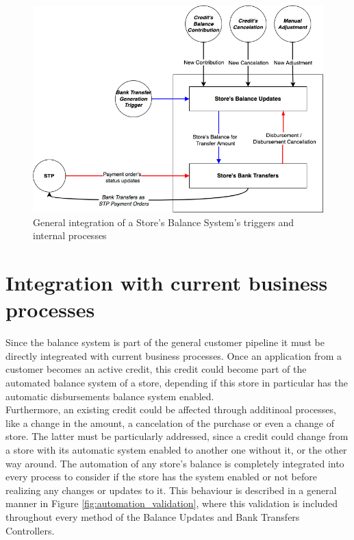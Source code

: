 \begin{figure} [H]
    \centering
    \includegraphics[scale = 0.5]{assets/diagrams/BalanceSystemDiagram.drawio.png}
    \caption{General integration of a Store's Balance System's triggers and internal processes}\label{fig:balance_systen_diaran}
\end{figure}

\section{Integration with current business processes}

Since the balance system is part of the general customer pipeline it must be directly integreated with current business processes. Once an application from a customer becomes an active credit, this credit could become part of the automated balance system of a store, depending if this store in particular has the automatic disbursements balance system enabled.\\

Furthermore, an existing credit could be affected through additinoal processes, like a change in the amount, a cancelation of the purchase or even a change of store. The latter must be particularly addressed, since a credit could change from a store with its automatic system enabled to another one without it, or the other way around. The automation of any store's balance is completely integrated into every process to consider if the store has the system enabled or not before realizing any changes or updates to it. This behaviour is described in a general manner in Figure \ref{fig:automation_validation}, where this validation is included throughout every method of the Balance Updates and Bank Transfers Controllers.

